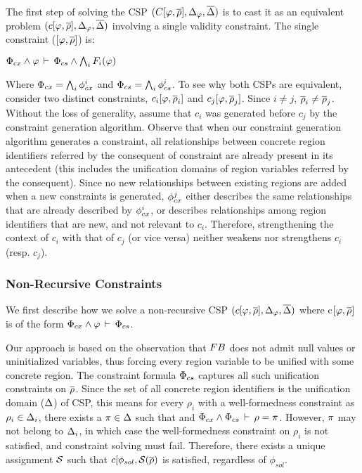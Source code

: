 The first step of solving the CSP $(C\lbrack \varphi,\overline{\rho} \rbrack,\Delta_{\varphi}, \overline{\Delta})$ is to cast it as an
equivalent problem $(c\lbrack \varphi,\overline{\rho} \rbrack,\Delta_{\varphi},\overline{\Delta})$ involving a single validity constraint. The
single constraint ($\lbrack \varphi,\overline{\rho} \rbrack$) is:
\begin{center}
\(
  \Phi_{cx} \wedge \varphi\,\vdash\,\Phi_{cs} \wedge  \bigwedge_i F_i(\varphi)
\)
\end{center}
Where $\Phi_{cx} = \bigwedge_i \phi_{cx}^{i}$ and $\Phi_{cs} = \bigwedge_i
\phi_{cs}^{i}$. To see why both CSPs are equivalent, consider two
distinct constraints, $c_i\lbrack \varphi,\overline{\rho}_i \rbrack$ and
$c_j\lbrack \varphi,\overline{\rho}_j \rbrack$. Since $i\neq j$, $\overline{\rho}_i
\neq \overline{\rho}_j$. Without the loss of generality, assume that $c_i$ was
generated before $c_j$ by the constraint generation algorithm. Observe
that when our constraint generation algorithm generates a constraint,
all relationships between concrete region identifiers referred by the
consequent of constraint are already present in its antecedent (this
includes the unification domains of region variables referred by the
consequent).  Since no new relationships between existing regions are
added when a new constraints is generated, $\phi_{cx}^j$ either
describes the same relationships that are already described by
$\phi_{cx}^i$, or describes relationships among region identifiers that
are new, and not relevant to $c_i$. Therefore, strengthening the
context of $c_i$ with that of $c_j$ (or vice versa) neither weakens
nor strengthens $c_i$ (resp.  $c_j$).

\subsubsection{Non-Recursive Constraints}
\label{sec:csolve}

We first describe how we solve a non-recursive CSP $(c\lbrack \varphi,\overline{\rho} \rbrack,\Delta_{\varphi},\overline{\Delta})$ where
c$\lbrack \varphi,\overline{\rho} \rbrack$ is of the form $\Phi_{cx}
\wedge \varphi\,\vdash\,\Phi_{cs}$. 

Our approach is based on the observation that ${\sc FB}$ does not admit
null values or uninitialized variables, thus forcing every region
variable to be unified with some concrete region. The constraint
formula $\Phi_{cs}$ captures all such unification constraints on
$\overline{\rho}$. Since the set of all concrete region identifiers is the
unification domain ($\Delta$) of CSP, this means for every $\rho_i$
with a well-formedness constraint as $\rho_i \in \Delta_i$, there
exists a $\pi \in \Delta$ such that and $\Phi_{cx} \wedge
\Phi_{cs}\,\vdash\,\rho = \pi$. However, $\pi$ may not belong to $\Delta_i$,
in which case the well-formedness constraint on $\rho_i$ is not
satisfied, and constraint solving must fail.  Therefore, there exists
a unique assignment $\mathcal{S}$ such that $c\lbrack
\phi_{sol},\mathcal{S}(\overline{\rho})$ is satisfied, regardless of
$\phi_{sol}$.

